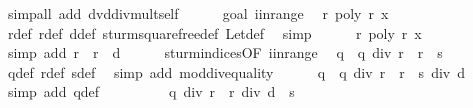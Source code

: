 \begin{isabellebody}
\ {\isacharparenleft}simp{\isacharunderscore}all\ add{\isacharcolon}\ dvd{\isacharunderscore}div{\isacharunderscore}mult{\isacharunderscore}self{\isacharparenright}\isanewline
\ \ \ \ \isamarkupfalse%
\ goal{}{\isacharparenleft}{}{\isacharparenright}\ i{\isacharunderscore}in{\isacharunderscore}range\ \isamarkupfalse%
\ r{\isacharprime}{\isacharunderscore}{}{\isacharcolon}\ {\isachardoublequoteopen}poly\ r{\isacharprime}\ x\ {\isacharequal}\ {}{\isachardoublequoteclose}\ \isanewline
\ \ \ \ \ \ \ \ \isamarkupfalse%
\ r{\isacharprime}{\isacharunderscore}def\ r{\isacharunderscore}def\ d{\isacharunderscore}def\ sturm{\isacharunderscore}squarefree{\isacharprime}{\isacharunderscore}def\ Let{\isacharunderscore}def\ \isamarkupfalse%
\ simp\isanewline
\ \ \ \ \isamarkupfalse%
\ r{\isacharunderscore}{}{\isacharcolon}\ {\isachardoublequoteopen}poly\ r\ x\ {\isacharequal}\ {}{\isachardoublequoteclose}\ \isamarkupfalse%
\ {\isacharparenleft}simp\ add{\isacharcolon}\ {\isacharbackquoteopen}r\ {\isacharequal}\ r{\isacharprime}\ {\isacharasterisk}\ d{\isacharbackquoteclose}{\isacharparenright}\isanewline
\ \ \ \ \isamarkupfalse%
\ sturm{\isacharunderscore}indices{\isacharbrackleft}OF\ i{\isacharunderscore}in{\isacharunderscore}range{\isacharbrackright}\ \isamarkupfalse%
\ {\isachardoublequoteopen}q\ {\isacharequal}\ q\ div\ r\ {\isacharasterisk}\ r\ {\isacharminus}\ s{\isachardoublequoteclose}\isanewline
\ \ \ \ \ \ \ \ \isamarkupfalse%
\ q{\isacharunderscore}def\ r{\isacharunderscore}def\ s{\isacharunderscore}def\ \isamarkupfalse%
\ {\isacharparenleft}simp\ add{\isacharcolon}\ mod{\isacharunderscore}div{\isacharunderscore}equality{\isacharparenright}\isanewline
\ \ \ \ \isamarkupfalse%
\ {\isachardoublequoteopen}q{\isacharprime}\ {\isacharequal}\ {\isacharparenleft}q\ div\ r\ {\isacharasterisk}\ r\ {\isacharminus}\ s{\isacharparenright}\ div\ d{\isachardoublequoteclose}\ \isamarkupfalse%
\ {\isacharparenleft}simp\ add{\isacharcolon}\ q{\isacharprime}{\isacharunderscore}def{\isacharparenright}\isanewline
\ \ \ \ \isamarkupfalse%
\ \isamarkupfalse%
\ {\isachardoublequoteopen}{\isachardot}{\isachardot}{\isachardot}\ {\isacharequal}\ {\isacharparenleft}q\ div\ r\ {\isacharasterisk}\ r{\isacharparenright}\ div\ d\ {\isacharminus}\ s{\isacharprime}{\isachardoublequoteclose}\ \isanewline

\end{isabellebody}
